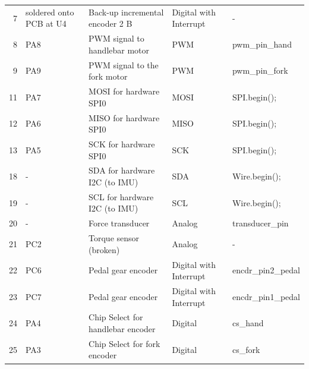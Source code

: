 \begin{table}[h!]
{\begin{tabular}{rllll}
            7             & soldered onto PCB at U4  & Back-up incremental encoder 2 B          & Digital with Interrupt  & -                               \\
            8             & PA8                      & PWM signal to handlebar motor            & PWM                     & pwm\_pin\_hand                  \\
            9             & PA9                      & PWM signal to the fork motor             & PWM                     & pwm\_pin\_fork                  \\
            11            & PA7                      & MOSI for hardware SPI0                   & MOSI                    & SPI.begin();                    \\
            12            & PA6                      & MISO for hardware SPI0                   & MISO                    & SPI.begin();                    \\
            13            & PA5                      & SCK for hardware SPI0                    & SCK                     & SPI.begin();                    \\
            18            & -                        & SDA for hardware I2C (to IMU)            & SDA                     & Wire.begin();                   \\
            19            & -                        & SCL for hardware I2C (to IMU)            & SCL                     & Wire.begin();                   \\
            20            & -                        & Force transducer                         & Analog                  & transducer\_pin                 \\
            21            & PC2                      & Torque sensor (broken)                   & Analog                  & -                               \\
            22            & PC6                      & Pedal gear encoder                       & Digital with Interrupt  & encdr\_pin2\_pedal              \\
            23            & PC7                      & Pedal gear encoder                       & Digital with Interrupt  & encdr\_pin1\_pedal              \\
            24            & PA4                      & Chip Select for handlebar encoder        & Digital                 & cs\_hand                        \\
            25            & PA3                      & Chip Select for fork encoder             & Digital                 & cs\_fork                        \\

\end{tabular}}
\end{table}
